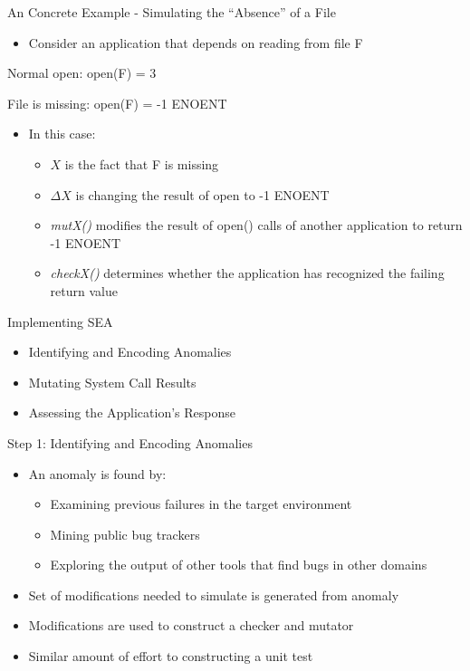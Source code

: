 \documentclass[pdf]{beamer}
\begin{document}
\begin{frame}{An Concrete Example - Simulating the ``Absence'' of a File}
  \begin{itemize}
    \item{Consider an application that depends on reading from file F}
  \end{itemize}

  Normal open: open(F) = 3

  File is missing: open(F) = -1 ENOENT

  \begin{itemize}
    \item{In this case:}
      \begin{itemize}
        \item{$X$ is the fact that F is missing}
        \item{$\Delta X$ is changing the result of open to -1 ENOENT}
        \item{\textit{mutX()} modifies the result of open() calls of another
          application to return -1 ENOENT}
        \item{\textit{checkX()} determines whether the application has
          recognized the failing return value}
      \end{itemize}
  \end{itemize}
\end{frame}


\begin{frame}{Implementing SEA}
  \begin{itemize}
    \item{Identifying and Encoding Anomalies}
    \item{Mutating System Call Results}
    \item{Assessing the Application's Response}
  \end{itemize}
\end{frame}


\begin{frame}{Step 1: Identifying and Encoding Anomalies}
  \begin{itemize}
    \item{An anomaly is found by:}
      \begin{itemize}
        \item{Examining previous failures in the target environment}
        \item{Mining public bug trackers}
        \item{Exploring the output of other tools that find bugs in other
          domains}
      \end{itemize}
    \item{Set of modifications needed to simulate is generated from anomaly}
    \item{Modifications are used to construct a checker and mutator}
    \item{Similar amount of effort to constructing a unit test}
  \end{itemize}
\end{frame}
\end{document}
